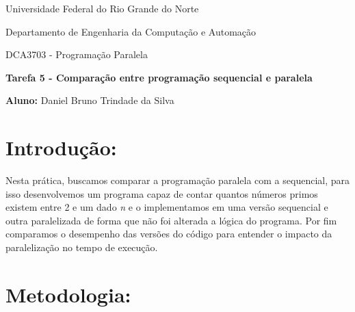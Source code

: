 \documentclass[a4paper, 12pt]{article}
\begin{document}
	\begin{center}
		Universidade Federal do Rio Grande do Norte
		
		Departamento de Engenharia da Computação e Automação
		
		DCA3703 - Programação Paralela
		
		\textbf{Tarefa 5 - Comparação entre programação sequencial e paralela}
		
		\textbf{Aluno:} Daniel Bruno Trindade da Silva
	\end{center}
	
	\section{Introdução:}
	\hspace{.7cm}Nesta prática, buscamos comparar a programação paralela com a sequencial, para isso desenvolvemos um programa capaz de contar quantos números primos existem entre 2 e um dado \textit{n} e o implementamos em uma versão sequencial e outra paralelizada de forma que não foi alterada a lógica do programa. Por fim comparamos o desempenho das versões do código para entender o impacto da paralelização no tempo de execução.
	
	\section{Metodologia:}
	
\end{document}

